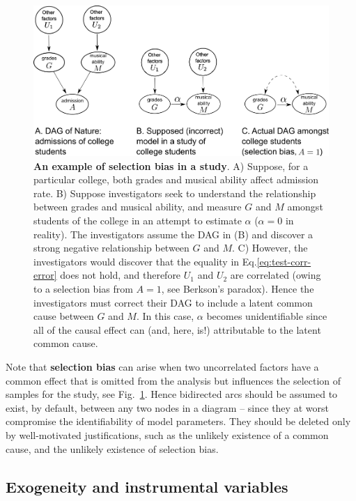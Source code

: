 \documentclass[11pt]{article}
\numberwithin{equation}{section}
\begin{document}
\begin{figure}
\begin{center}
\includegraphics[width=0.8\columnwidth]{figures/selection-bias.png}  
\end{center}
\caption{\textbf{An example of selection bias in a study}. A) Suppose, for a particular college, both grades and musical ability affect admission rate. B) Suppose investigators seek to understand the relationship between grades and musical ability, and measure $G$ and $M$ amongst students of the college in an attempt to estimate $\alpha$ ($\alpha=0$ in reality). The investigators assume the DAG in (B) and discover a strong negative relationship between $G$ and $M$. C) However, the investigators would discover that the equality in Eq.\eqref{eq:test-corr-error} does not hold, and therefore $U_1$ and $U_2$ are correlated (owing to a selection bias from $A=1$, see Berkson's paradox). Hence the investigators must correct their DAG to include a latent common cause between $G$ and $M$. In this case, $\alpha$ becomes unidentifiable since all of the causal effect can (and, here, is!) attributable to the latent common cause.}
\label{Fig:selection-bias}
\end{figure}

Note that \textbf{selection bias} can arise when two uncorrelated factors have a common effect that is omitted from the analysis but influences the selection of samples for the study, see Fig.~\ref{Fig:selection-bias}. Hence bidirected arcs should be assumed to exist, by default, between any two nodes in a diagram -- since they at worst compromise the identifiability of model parameters. They should be deleted only by well-motivated justifications, such as the unlikely existence of a common cause, and the unlikely existence of selection bias.

\subsection{Exogeneity and instrumental variables}
\end{document}
